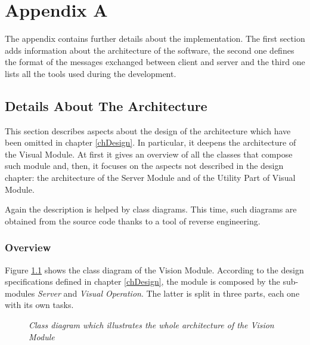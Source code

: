 \chapter{Appendix A}\label{app}
	The appendix contains further details about the implementation.
	The first section adds information about the architecture of the software, the second one defines the format of the messages exchanged between client and server and the third one lists all the tools used during the development.	
			

	\section{Details About The Architecture} \label{appA}
		This section describes aspects about the design of the architecture which have been omitted in chapter \ref{chDesign}.
		In particular, it deepens the architecture of the Visual Module.
		At first it gives an overview of all the classes that compose such module and, then, it focuses on the aspects not described in the design chapter: the architecture of the Server Module and of the Utility Part of Visual Module.
		
		
		Again the description is helped by class diagrams. 
		This time, such diagrams are obtained from the source code thanks to a tool of reverse engineering.
	
		\subsection{Overview}\label{impl_arch}
		Figure \ref{fig:implementation_names} shows the class diagram of the Vision Module. 
		According to the design specifications defined in chapter \ref{chDesign}, the module is composed by the sub-modules \emph{Server} and \emph{Visual Operation}. 
		The latter is split in three parts, each one with its own tasks.

		\begin{figure}[h]
		  \begin{center} 
		  \end{center} 
		  \caption{\textit{Class diagram which illustrates the whole architecture of the Vision Module}}  
		  \label{fig:implementation_names}
	 	\end{figure}
 
